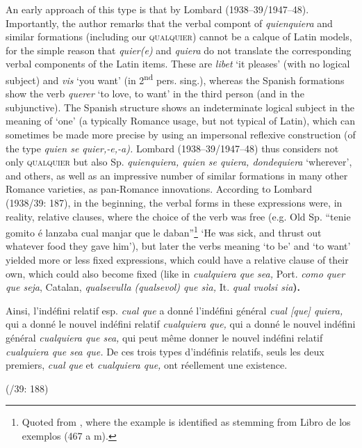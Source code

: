 \documentclass[output=paper]{langscibook}
\begin{document}
  An early approach of this type is that by Lombard (1938–39/1947–48). Importantly, the author remarks that the verbal compont of \textit{quienquiera} and similar formations (including our \textsc{qualquier}) cannot be a calque of Latin models, for the simple reason that \textit{quier(e)} and \textit{quiera} do not translate the corresponding verbal components of the Latin items. These are \textit{libet} ‘it pleases’ (with no logical subject) and \textit{vis} ‘you want’ (in 2\textsuperscript{nd} pers. sing.), whereas the Spanish formations show the verb \textit{querer} ‘to love, to want’ in the third person (and in the subjunctive). The Spanish structure shows an indeterminate logical subject in the meaning of ‘one’ (a typically Romance usage, but not typical of Latin), which can sometimes be made more precise by using an impersonal reflexive construction (of the type \textit{quien se quier,\nobreakdash-e,\nobreakdash-a).} Lombard (1938–39/1947–48) thus considers not only \textsc{qualquier} but also Sp. \textit{quienquiera, quien se quiera, dondequiera} ‘wherever’, and others, as well as an impressive number of similar formations in many other Romance varieties, as pan-Romance innovations. According to Lombard (1938/39: 187), in the beginning, the verbal forms in these expressions were, in reality, relative clauses, where the choice of the verb was free (e.g. Old Sp. “tenie gomito é lanzaba cual manjar que le daban”\footnote{Quoted from \citet[159]{Gessner1895}, where the example is identified as stemming from Libro de los exemplos (467 a m).} ‘He was sick, and thrust out whatever food they gave him’), but later the verbs meaning ‘to be’ and ‘to want’ yielded more or less fixed expressions, which could have a relative clause of their own, which could also become fixed (like in \textit{cualquiera que sea,} Port. \textit{como quer que seja}, Catalan, \textit{qualsevulla (qualsevol) que sìa,} It. \textit{qual vuolsi sia}\textbf{).}

Ainsi, l’indéfini relatif esp. \textit{cual que} a donné l’indéfini général \textit{cual [que] quiera,} qui a donné le nouvel indéfini relatif \textit{cualquiera que,} qui a donné le nouvel indéfini général \textit{cualquiera que sea,} qui peut même donner le nouvel indéfini relatif \textit{cualquiera que sea que.} De ces trois types d’indéfinis relatifs, seuls les deux premiers, \textit{cual que} et \textit{cualquiera que,} ont réellement une existence.

    (\citealt{Lombard1938}/39: 188)
\end{document}
